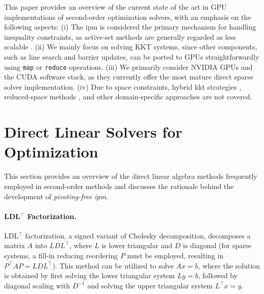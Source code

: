 \documentclass{article}
\begin{document}
This paper provides an overview of the current state of the art in GPU implementations of second-order optimization solvers, with an emphasis on the following aspects: (i) The \gls*{ipm} is considered the primary mechanism for handling inequality constraints, as active-set methods are generally regarded as less scalable \cite{nocedalNumericalOptimization2006}. (ii) We mainly focus on solving KKT systems, since other components, such as line search and barrier updates, can be ported to GPUs straightforwardly using \texttt{map} or \texttt{reduce} operations. (iii) We primarily consider NVIDIA GPUs and the CUDA software stack, as they currently offer the most mature direct sparse solver implementation. (iv) Due to space constraints, hybrid \gls*{kkt} strategies \cite{regevHyKKTHybridDirectiterative2023}, reduced-space methods \cite{pacaudAcceleratingCondensedInteriorPoint2023}, and other domain-specific approaches \cite{adabagMPCGPURealTimeNonlinear2024} are not covered.



\section{Direct Linear Solvers for Optimization}\label{eqn:linear}
This section provides an overview of the direct linear algebra methods frequently employed in second-order methods and discusses the rationale behind the development of \emph{pivoting-free \gls*{ipm}}.

\paragraph{LDL$^\top$ Factorization.}
LDL$^\top$ factorization, a signed variant of Cholesky decomposition, decomposes a matrix $A$ into $LDL^\top$, where $L$ is lower triangular and $D$ is diagonal (for sparse systems, a fill-in reducing reordering $P$ must be employed, resulting in $P^\top A P = L D L^\top$). This method can be utilized to solve $Ax = b$, where the solution is obtained by first solving the lower triangular system $Ly = b$, followed by diagonal scaling with $D^{-1}$ and solving the upper triangular system $L^\top x = y$.
\end{document}
